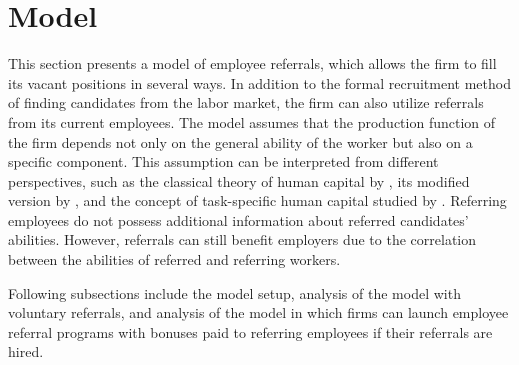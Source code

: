 \documentclass[12pt]{article}
\begin{document}


\section{Model} \label{sec:model}
This section presents a model of employee referrals, which allows the firm to fill its vacant positions in several ways. In addition to the formal recruitment method of finding candidates from the labor market, the firm can also utilize referrals from its current employees. The model assumes that the production function of the firm depends not only on the general ability of the worker but also on a specific component. This assumption can be interpreted from different perspectives, such as the classical theory of human capital by \cite{becker1962investment}, its modified version by \cite{lazear2009firm}, and the concept of task-specific human capital studied by \cite{gibbons2004task}. Referring employees do not possess additional information about referred candidates' abilities. However, referrals can still benefit employers due to the correlation between the abilities of referred and referring workers. 

Following subsections include the model setup, analysis of the model with voluntary referrals, and analysis of the model in which firms can launch employee referral programs with bonuses paid to referring employees if their referrals are hired. 
\end{document}
